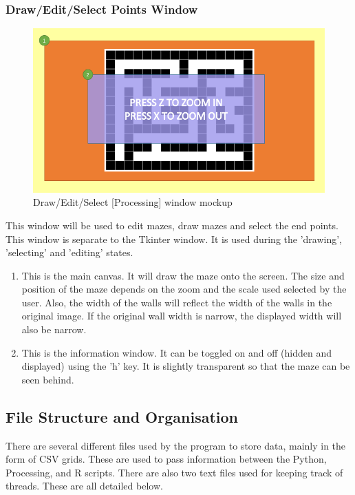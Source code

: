 \documentclass[titlepage]{article}
\begin{document}
\subsubsection{Draw/Edit/Select Points Window}
\begin{figure}[H]
  \centering
  \includegraphics[width=12cm]{Slide6.png}
  \caption{Draw/Edit/Select [Processing] window mockup}
  \label{fig:dijk}
\end{figure}

This window will be used to edit mazes, draw mazes and select the end points. This window is separate to the Tkinter window. It is used during the 'drawing', 'selecting' and 'editing' states.
\begin{enumerate}
\item This is the main canvas. It will draw the maze onto the screen. The size and position of the maze depends on the zoom and the scale used selected by the user. Also, the width of the walls will reflect the width of the walls in the original image. If the original wall width is narrow, the displayed width will also be narrow.
\item This is the information window. It can be toggled on and off (hidden and displayed) using the 'h' key. It is slightly transparent so that the maze can be seen behind.
\end{enumerate}

\subsection{File Structure and Organisation}
There are several different files used by the program to store data, mainly in the form of CSV grids. These are used to pass information between the Python, Processing, and R scripts. There are also two text files used for keeping track of threads. These are all detailed below.
\end{document}
